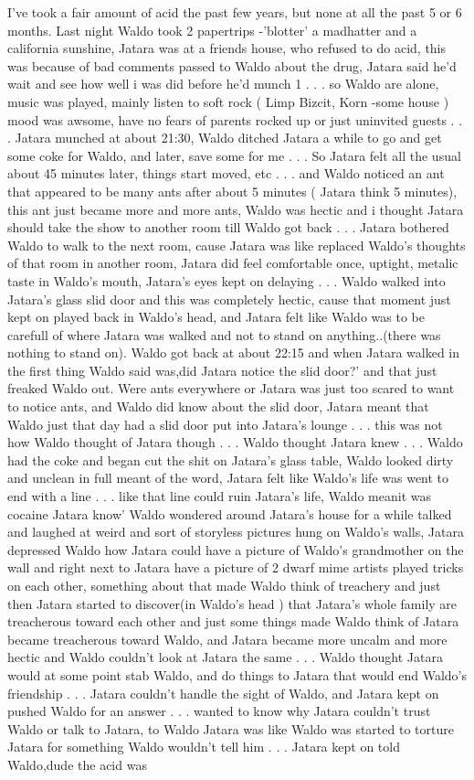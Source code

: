 \documentclass[12pt]{book}
\begin{document}
I've took a fair amount of acid the past few years, but none at all the past 5 or 6 months. Last night Waldo took 2 papertrips -'blotter' a madhatter and a california sunshine, Jatara was at a friends house, who refused to do acid, this was because of bad comments passed to Waldo about the drug, Jatara said he'd wait and see how well i was did before he'd munch 1 . . .  so Waldo are alone, music was played, mainly listen to soft rock ( Limp Bizcit, Korn -some house ) mood was awsome, have no fears of parents rocked up or just uninvited guests . . .  Jatara munched at about 21:30, Waldo ditched Jatara a while to go and get some coke for Waldo, and later, save some for me . . .  So Jatara felt all the usual about 45 minutes later, things start moved, etc . . .  and Waldo noticed an ant that appeared to be many ants after about 5 minutes ( Jatara think 5 minutes), this ant just became more and more ants, Waldo was hectic and i thought Jatara should take the show to another room till Waldo got back . . .  Jatara bothered Waldo to walk to the next room, cause Jatara was like replaced Waldo's thoughts of that room in another room, Jatara did feel comfortable once, uptight, metalic taste in Waldo's mouth, Jatara's eyes kept on delaying . . .  Waldo walked into Jatara's glass slid door and this was completely hectic, cause that moment just kept on played back in Waldo's head, and Jatara felt like Waldo was to be carefull of where Jatara was walked and not to stand on anything..(there was nothing to stand on). Waldo got back at about 22:15 and when Jatara walked in the first thing Waldo said was,did Jatara notice the slid door?' and that just freaked Waldo out. Were ants everywhere or Jatara was just too scared to want to notice ants, and Waldo did know about the slid door, Jatara meant that Waldo just that day had a slid door put into Jatara's lounge . . .  this was not how Waldo thought of Jatara though . . .  Waldo thought Jatara knew . . .  Waldo had the coke and began cut the shit on Jatara's glass table, Waldo looked dirty and unclean in full meant of the word, Jatara felt like Waldo's life was went to end with a line . . .  like that line could ruin Jatara's life, Waldo meanit was cocaine Jatara know' Waldo wondered around Jatara's house for a while talked and laughed at weird and sort of storyless pictures hung on Waldo's walls, Jatara depressed Waldo how Jatara could have a picture of Waldo's grandmother on the wall and right next to Jatara have a picture of 2 dwarf mime artists played tricks on each other, something about that made Waldo think of treachery and just then Jatara started to discover(in Waldo's head ) that Jatara's whole family are treacherous toward each other and just some things made Waldo think of Jatara became treacherous toward Waldo, and Jatara became more uncalm and more hectic and Waldo couldn't look at Jatara the same . . .  Waldo thought Jatara would at some point stab Waldo, and do things to Jatara that would end Waldo's friendship . . .  Jatara couldn't handle the sight of Waldo, and Jatara kept on pushed Waldo for an answer . . .  wanted to know why Jatara couldn't trust Waldo or talk to Jatara, to Waldo Jatara was like Waldo was started to torture Jatara for something Waldo wouldn't tell him . . .  Jatara kept on told Waldo,dude the acid was 
\end{document}
